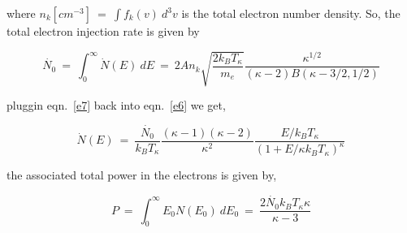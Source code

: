 \noindent where $n_{k}[cm^{-3}]~=~\int f_{k}(v)~d^{3}v$ is the total electron number density. So, the total electron injection rate is given by

\begin{equation}\label{e7}
    \dot{N_{0}}~=~\int_{0}^{\infty}\dot{N}(E)~dE~=~2An_k\sqrt{\frac{2k_{B}T_{\kappa}}{m_e}}\frac{\kappa^{1/2}}{(\kappa-2)B(\kappa-3/2,1/2)}
\end{equation}

\noindent pluggin eqn.~\ref{e7} back into eqn.~\ref{e6} we get,

\begin{equation}
    \dot{N}(E)~=~\frac{\dot{N_0}}{k_{B}T_{\kappa}}\frac{(\kappa-1)(\kappa-2)}{\kappa^2}\frac{E/k_{B}T_{\kappa}}{(1+E/\kappa k_{B}T_{\kappa})^{\kappa}}
\end{equation}

\noindent the associated total power in the electrons is given by, 

\begin{equation}
    P~=~\int_0^{\infty}E_{0}N(E_{0})~dE_{0}~=~\frac{2\dot{N_{0}}k_BT_{\kappa}\kappa}{\kappa-3}
\end{equation}

